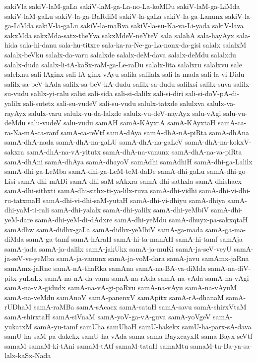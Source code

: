 {sakiVla
sakiV-laM-gaLa
sakiV-laM-ga-La-no-La-koMDu
sakiV-laM-ga-LiMda
sakiV-laM-gaLu
sakiV-la-ga-BaRdiM
sakiV-la-gaLa
sakiV-la-ga-Lanunx
sakiV-la-ga-LiMda
sakiV-la-gaLu
sakiV-la-maRva
sakiV-la-su-Ka-va-Li-yada
sakiV-lava
sakxMda
sakxMda-satx-theYva
sakxMdeV-neYteV
sala
salahA
sala-hayAyx
sala-hida
sala-hi-danu
sala-hu-titxre
sala-ka-ra-Ne-ga-La-nonx-da-gisi
salalx
salalxM
salalx-beVku
salalx-da-varu
salalxde
salalx-deM-dava
salalx-deMdu
salalxdu
salalx-duda
salalx-li-tA-kaSx-raM-ga-Le-raDu
salalx-lita
salalxru
salalxvu
sale
salelxnu
sali-lAginx
sali-lA-ginx-vAyu
salila
salilalx
sali-la-mada
sali-la-vi-Didu
salilx-sa-beV-kAda
salilx-sa-beV-kA-dudu
salilx-sa-dudu
salilxsi
salilx-suva
salilx-su-vudu
salilx-yi-ralu
salisi
sali-sida
sali-si-dalilx
sali-si-diri
sali-si-doV-pA-di-yalilx
sali-sutetx
sali-su-vudeV
sali-su-vudu
salulx-tatxde
salulxva
salulx-va-rayAyx
salulx-varu
salulx-vu-da-lalxde
salulx-vu-deV-nayAyx
salu-vAgi
salu-vu-deMdu
salu-vudeV
salu-vudu
samAH
samA-KAyxtA
samA-KAyxtaH
samA-ca-ra-Na-mA-ca-ranf
samA-ca-reVtf
samA-dAya
samA-dhA-nA-piRta
samA-dhAna
samA-dhA-nada
samA-dhA-na-gaLU
samA-dhA-na-gaLeV
samA-dhA-na-kokxV-sakxra
samA-dhA-na-vA-yitutx
samA-dhA-na-vanunx
samA-dhA-na-va-piRta
samA-dhAni
samA-dhAya
samA-dhayoV
samAdhi
samAdhiH
samA-dhi-ga-Lalilx
samA-dhi-ga-LeMba
samA-dhi-ga-LeM-teM-daDe
samA-dhi-gaLu
samA-dhi-go-Lisi
samA-dhi-mADi
samA-dhi-saM-sAkxra
samA-dhi-sathxla
samA-dhishacx
samA-dhi-sithxti
samA-dhi-sithx-ti-ya-lilx-ruva
samA-dhi-vidhi
samA-dhi-vi-dhi-ru-tatxmaH
samA-dhi-vi-dhi-saM-yutaH
samA-dhi-vi-dhiyu
samA-dhiya
samA-dhi-yaM-ti-rali
samA-dhi-yalalx
samA-dhi-yalilx
samA-dhi-yeMbiV
samA-dhi-yeM-dare
samA-dhi-yeM-di-dAdxre
samA-dhi-yeMdu
samA-dhuyx-pa-sakxqtaH
samAdhw
samA-didhx-gaLa
samA-didhx-yeMbiV
samA-ga-mada
samA-ga-ma-diMda
samA-ga-tamf
samA-hAraH
samA-hi-ta-manAH
samA-hi-tamf
samAja
samA-jada
samA-ja-dalilx
samA-jakUkx
samA-ja-muKi
samA-ja-seV-veyU
samA-ja-seV-ve-yeMba
samA-ja-vanunx
samA-ja-voM-dara
samA-javu
samAmx-jaRna
samAmx-jaRne
samA-nA-thaRka
samAna
samA-na-BA-va-diMda
samA-na-diV-pitx-yuLaLx
samA-na-nA-da-vanu
samA-na-rAda
samA-na-vAda
samA-na-vAgi
samA-na-vA-gidudx
samA-na-vA-gi-paRvu
samA-na-vAyu
samA-na-vAyuM
samA-na-veMdu
samAnoV
samA-panenxV
samApitx
samA-rA-dhanaM
samA-rUDhaM
samA-raMBa
samA-sAcacx
samA-sataH
samA-savu
samA-shirxVtaM
samA-shirxtaH
samA-siVnaM
samA-yoV-ga-vA-guva
samA-yoVgeV
samA-yukatxM
samA-yu-tamf
samUha
samUhaH
samU-hakekx
samU-ha-parx-sA-dava
samU-ha-saM-pa-dakekx
samU-ha-vAda
sama
sama-BayxcayxR
sama-Bayx-seVtf
samaM
samaM-ki-tAni
samaM-tAtf
samaM-tataH
samaMtu
samaM-tu-Ba-ya-sa-lalx-kaSx-Nada
}
